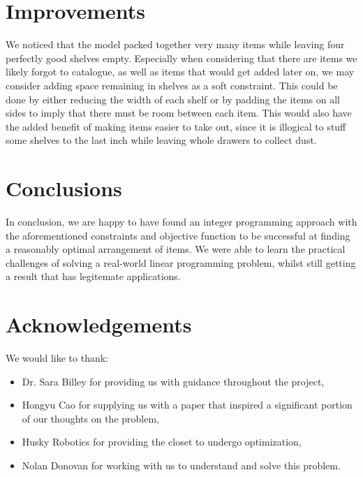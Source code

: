 \documentclass[10pt]{article}
\theoremstyle{named}
\begin{document}
\section{Improvements}
We noticed that the model packed together very many items while leaving four
perfectly good shelves empty. Especially when considering that there are items
we likely forgot to catalogue, as well as items that would get added later on,
we may consider adding space remaining in shelves as a soft constraint. This
could be done by either reducing the width of each shelf or by padding the
items on all sides to imply that there must be room between each item. This
would also have the added benefit of making items easier to take out, since
it is illogical to stuff some shelves to the last inch while leaving whole
drawers to collect dust.

\section{Conclusions}
In conclusion, we are happy to have found an integer programming approach
with the aforementioned constraints and objective function to be successful
at finding a reasonably optimal arrangement of items. We were able to learn
the practical challenges of solving a real-world linear programming problem,
whilst still getting a result that has legitemate applications. 

\section{Acknowledgements}
We would like to thank:
\begin{itemize}
\item Dr. Sara Billey for providing us with guidance throughout the project,
\item Hongyu Cao for supplying us with a paper that inspired a significant portion of our thoughts on the problem,
\item Husky Robotics for providing the closet to undergo optimization,
\item Nolan Donovan for working with us to understand and solve this problem.
\end{itemize}
\end{document}

